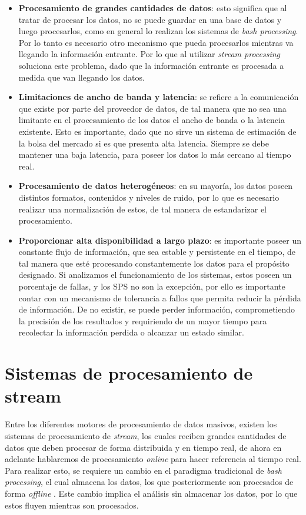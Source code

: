 \begin{itemize}
	\item \textbf{Procesamiento de grandes cantidades de datos}: esto significa que al tratar de procesar los datos, no se puede guardar en una base de datos y luego procesarlos, como en general lo realizan los sistemas de \textit{bash processing}. Por lo tanto es necesario otro mecanismo que pueda procesarlos mientras va llegando la información entrante. Por lo que al utilizar \textit{stream processing} soluciona este problema, dado que la información entrante es procesada a medida que van llegando los datos.
	\item \textbf{Limitaciones de ancho de banda y latencia}: se refiere a la comunicación que existe por parte del proveedor de datos, de tal manera que no sea una limitante en el procesamiento de los datos el ancho de banda o la latencia existente. Esto es importante, dado que no sirve un sistema de estimación de la bolsa del mercado si es que presenta alta latencia. Siempre se debe mantener una baja latencia, para poseer los datos lo más cercano al tiempo real.
	\item \textbf{Procesamiento de datos heterogéneos}: en su mayoría, los datos poseen distintos formatos, contenidos y niveles de ruido, por lo que es necesario realizar una normalización de estos, de tal manera de estandarizar el procesamiento.
	\item \textbf{Proporcionar alta disponibilidad a largo plazo}: es importante poseer un constante flujo de información, que sea estable y persistente en el tiempo, de tal manera que esté procesando constantemente los datos para el propósito designado. Si analizamos el funcionamiento de los sistemas, estos poseen un porcentaje de fallas, y los SPS no son la excepción, por ello es importante contar con un mecanismo de tolerancia a fallos que permita reducir la pérdida de información. De no existir, se puede perder información, comprometiendo la precisión de los resultados y requiriendo de un mayor tiempo para recolectar la información perdida o alcanzar un estado similar.
\end{itemize}

\section{Sistemas de procesamiento de stream}
\label{sec:SPS}

Entre los diferentes motores de procesamiento de datos masivos, existen los sistemas de procesamiento de \textsl{stream}, los cuales reciben grandes cantidades de datos que deben procesar de forma distribuida y en tiempo real, de ahora en adelante hablaremos de procesamiento \textsl{online} para hacer referencia al tiempo real. Para realizar esto, se requiere un cambio en el paradigma tradicional de \textsl{bash processing}, el cual almacena los datos, los que posteriormente son procesados de forma \textsl{offline} \citep{HawwashN14}. Este cambio implica el análisis sin almacenar los datos, por lo que estos fluyen mientras son procesados.

